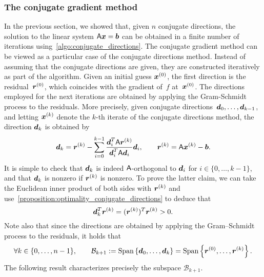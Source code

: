 \subsubsection{The conjugate gradient method}%
\label{ssub:the_conjugate_gradient_method}
In the previous section,
we showed that, given $n$ conjugate directions,
the solution to the linear system $\mathsf A \mathbf{\boldsymbol{x}} = \mathbf{\boldsymbol{b}}$ can be obtained in a finite number of iterations using~\cref{algo:conjugate_directions}.
The conjugate gradient method can be viewed as a particular case of the conjugate directions method.
Instead of assuming that the conjugate directions are given,
they are constructed iteratively as part of the algorithm.
Given an initial guess $\mathbf{\boldsymbol{x}}^{(0)}$,
the first direction is the residual~$\mathbf{\boldsymbol{r}}^{(0)}$,
which coincides with the gradient of~$f$ at~$\mathbf{\boldsymbol{x}}^{(0)}$.
The directions employed for the next iterations are obtained by applying the Gram-Schmidt process
to the residuals.
More precisely, given conjugate directions~$\mathbf{\boldsymbol{d}}_0, \dotsc, \mathbf{\boldsymbol{d}}_{k-1}$,
and letting $\mathbf{\boldsymbol{x}}^{(k)}$ denote the $k$-th iterate of the conjugate directions method,
the direction $\mathbf{\boldsymbol{d}}_k$ is obtained by
\begin{equation}
    \label{eq:conjugate_gradient_gram_schmidt}
    \mathbf{\boldsymbol{d}}_k = \mathbf{\boldsymbol{r}}^{(k)} - \sum_{i=0}^{k-1} \frac{\mathbf{\boldsymbol{d}}_i^T \mathsf A \mathbf{\boldsymbol{r}}^{(k)}}{\mathbf{\boldsymbol{d}}_i^T \mathsf A \mathbf{\boldsymbol{d}}_i} \mathbf{\boldsymbol{d}}_i,
    \qquad \mathbf{\boldsymbol{r}}^{(k)} = \mathsf A \mathbf{\boldsymbol{x}}^{(k)} - \mathbf{\boldsymbol{b}}.
\end{equation}
It is simple to check that $\mathbf{\boldsymbol{d}}_k$  is indeed $\mathsf A$-orthogonal to $\mathbf{\boldsymbol{d}}_i$ for $i \in \{0, \dotsc, k-1\}$,
and that $\mathbf{\boldsymbol{d}}_k$ is nonzero if $\mathbf{\boldsymbol{r}}^{(k)}$ is nonzero.
To prove the latter claim,
we can take the Euclidean inner product of both sides with $\mathbf{\boldsymbol{r}}^{(k)}$ and use~\cref{proposition:optimality_conjugate_directions}
to deduce that
\begin{equation}
    \label{eq:conjugate_gradient_positive_omega}
    \mathbf{\boldsymbol{d}}_k^T \mathbf{\boldsymbol{r}}^{(k)} = (\mathbf{\boldsymbol{r}}^{(k)} )^T \mathbf{\boldsymbol{r}}^{(k)} > 0.
\end{equation}
Note also that since the directions are obtained by applying the Gram--Schmidt process to the residuals,
it holds that
\begin{equation}
    \label{eq:conjugate_gradient_equality_span}
    \forall k \in \{0, \dotsc, n-1\}, \qquad
    \mathcal B_{k+1} := \operatorname{Span}\left\{ \mathbf{\boldsymbol{d}}_0, \dotsc, \mathbf{\boldsymbol{d}}_{k} \right\} =
    \operatorname{Span}\left\{ \mathbf{\boldsymbol{r}}^{(0)}, \dotsc, \mathbf{\boldsymbol{r}}^{(k)} \right\}.
\end{equation}
The following result characterizes precisely the subspace $\mathcal B_{k+1}$.
